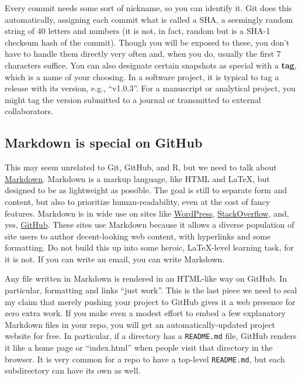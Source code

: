 \documentclass[12pt]{article}
\begin{document}
Every commit needs some sort of nickname, so you can identify it. Git
does this automatically, assigning each commit what is called a SHA, a
seemingly random string of 40 letters and numbers (it is not, in fact,
random but is a SHA-1 checksum hash of the commit). Though you will be
exposed to these, you don't have to handle them directly very often and,
when you do, usually the first 7 characters suffice. You can also
designate certain snapshots as special with a \textbf{tag}, which is a
name of your choosing. In a software project, it is typical to tag a
release with its version, e.g., ``v1.0.3''. For a manuscript or
analytical project, you might tag the version submitted to a journal or
transmitted to external collaborators.

\subsection{Markdown is special on
GitHub}\label{markdown-is-special-on-github}

This may seem unrelated to Git, GitHub, and R, but we need to talk about
\href{https://daringfireball.net/projects/markdown/syntax}{Markdown}.
Markdown is a markup language, like HTML and LaTeX, but designed to be
as lightweight as possible. The goal is still to separate form and
content, but also to prioritize human-readability, even at the cost of
fancy features. Markdown is in wide use on sites like
\href{https://en.support.wordpress.com/markdown/}{WordPress},
\href{https://stackoverflow.com/editing-help}{StackOverflow}, and, yes,
\href{https://help.github.com/categories/writing-on-github/}{GitHub}.
These sites use Markdown because it allows a diverse population of site
users to author decent-looking web content, with hyperlinks and some
formatting. Do not build this up into some heroic, LaTeX-level learning
task, for it is not. If you can write an email, you can write Markdown.

Any file written in Markdown is rendered in an HTML-like way on GitHub.
In particular, formatting and links ``just work''. This is the last
piece we need to seal my claim that merely pushing your project to
GitHub gives it a web presence for zero extra work. If you make even a
modest effort to embed a few explanatory Markdown files in your repo,
you will get an automatically-updated project website for free. In
particular, if a directory has a \texttt{README.md} file, GitHub renders
it like a home page or ``index.html'' when people visit that directory
in the browser. It is very common for a repo to have a top-level
\texttt{README.md}, but each subdirectory can have its own as well.
\end{document}
